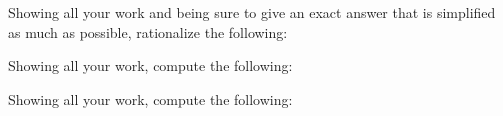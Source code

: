 \documentclass[12pt,letterpaper]{exam}
\begin{document}
\begin{questions}



\newpage
\question Showing all your work and being sure to give an exact answer that is simplified as much as possible, rationalize the following:



\newpage
\question Showing all your work, compute the following:



\newpage
\question Showing all your work, compute the following:
\end{questions}
\end{document}
